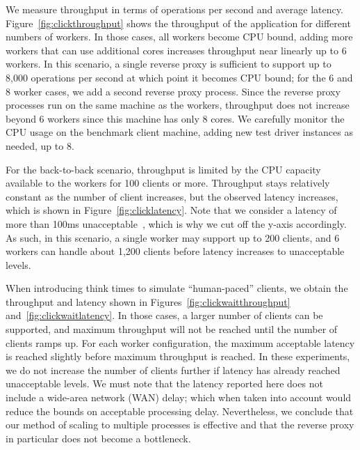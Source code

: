 \clickthroughput{}
\clicklatency{}

We measure throughput in terms of operations per second and average latency.  
Figure~\ref{fig:clickthroughput} shows the throughput of the application for different
numbers of workers. In those cases, all workers become CPU bound, adding more workers
that can use additional cores increases throughput near linearly up to 6 workers. 
In this scenario, a single reverse proxy is sufficient to support up to
8,000 operations per second at which point it becomes CPU bound;
for the 6 and 8 worker cases, we add a second reverse proxy process.
Since the reverse proxy processes run on the same machine as the workers, throughput 
does not increase beyond 6 workers since this machine has only 8 cores.
We carefully monitor the CPU usage on the benchmark client machine, adding new
test driver instances as needed, up to 8.

\clickwaitthroughput{}
\clickwaitlatency{}

For the back-to-back scenario, throughput is limited by the CPU capacity available
to the workers for 100 clients or more.  Throughput stays relatively constant as
the number of client increases, but the observed latency increases, which is
shown in Figure~\ref{fig:clicklatency}.  Note that we consider a latency of more than
100ms unacceptable~\cite{Nielsen1993Usability}, which is why we cut off the y-axis
accordingly.  As such, in this scenario, a single worker may support up to 200 clients,
and 6 workers can handle about 1,200 clients before latency increases to unacceptable
levels. 

When introducing think times to simulate ``human-paced'' clients, we obtain the
throughput and latency shown in Figures~\ref{fig:clickwaitthroughput} 
and~\ref{fig:clickwaitlatency}.  In those cases, a larger number of clients can be
supported, and maximum throughput will not be reached until the number of
clients ramps up.  For each worker configuration, the maximum acceptable latency 
is reached slightly before maximum throughput is reached.  In these experiments,
we do not increase the number of clients further if latency has already reached
unacceptable levels.
We must note that the latency reported here does not include a wide-area network (WAN) delay;
which when taken into account would reduce the bounds on acceptable processing delay.
Nevertheless, we conclude that our method of scaling to multiple processes is effective 
and that the reverse proxy in particular does not become a bottleneck.

